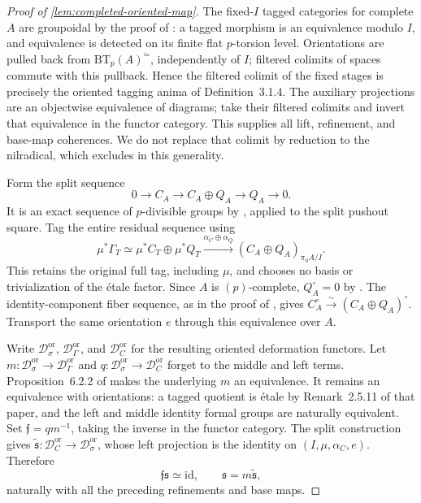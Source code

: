 \documentclass[11pt]{article}
\numberwithin{equation}{section}
\theoremstyle{definition}
\theoremstyle{remark}
\begin{document}
\begin{proof}[Proof of \cref{lem:completed-oriented-map}]
The fixed-\(I\) tagged categories for complete \(A\) are groupoidal by
the proof of \cite[Lemma~3.1.10]{LurieEllipticII2018}: a tagged morphism
is an equivalence modulo \(I\), and equivalence is detected on its finite
flat \(p\)-torsion level. Orientations are pulled back from
\(\mathrm{BT}_p(A)^\simeq\), independently of \(I\); filtered colimits
of spaces commute with this pullback. Hence the filtered colimit of the
fixed stages is precisely the oriented tagging anima of
Definition~3.1.4. The auxiliary projections are an objectwise
equivalence of diagrams; take their filtered colimits and invert that
equivalence in the functor category. This supplies all lift, refinement,
and base-map coherences. We do not replace that colimit by reduction
to the nilradical, which \cite[Warning~3.1.9]{LurieEllipticII2018} excludes
in this generality.

Form the split sequence
\[
 0\longrightarrow C_A\longrightarrow C_A\oplus Q_A
 \longrightarrow Q_A\longrightarrow0.
\]
It is an exact sequence of \(p\)-divisible groups by
\cite[Proposition~2.4.8]{LurieEllipticII2018}, applied to the split pushout
square. Tag the entire residual sequence using
\[
 \mu^*\Gamma_T\simeq\mu^*C_T\oplus\mu^*Q_T
 \xrightarrow{\alpha_C\oplus\alpha_Q}
 (C_A\oplus Q_A)_{\pi_0A/I}.
\]
This retains the original full tag, including \(\mu\), and chooses no
basis or trivialization of the étale factor. Since \(A\) is
\((p)\)-complete, \(Q_A^\circ=0\) by
\cite[Proposition~2.5.8]{LurieEllipticII2018}. The identity-component fiber
sequence, as in the proof of
\cite[Proposition~2.5.17]{LurieEllipticII2018}, gives
\(C_A^\circ\xrightarrow{\sim}(C_A\oplus Q_A)^\circ\).
Transport the same orientation \(e\) through this equivalence over \(A\).

Write \(\mathscr D_\sigma^{\mathrm{or}}\),
\(\mathscr D_\Gamma^{\mathrm{or}}\), and
\(\mathscr D_C^{\mathrm{or}}\) for the resulting oriented deformation
functors. Let \(m:\mathscr D_\sigma^{\mathrm{or}}\to
\mathscr D_\Gamma^{\mathrm{or}}\) and
\(q:\mathscr D_\sigma^{\mathrm{or}}\to\mathscr D_C^{\mathrm{or}}\)
forget to the middle and left terms. Proposition~6.2.2 of
\cite{LurieEllipticII2018} makes the underlying \(m\) an equivalence.
It remains an equivalence with orientations: a tagged quotient is étale
by Remark~2.5.11 of that paper, and the left and middle identity formal
groups are naturally equivalent. Set \(\mathfrak f=qm^{-1}\), taking the
inverse in the functor category. The split construction gives
\(\widetilde{\mathfrak s}:\mathscr D_C^{\mathrm{or}}\to
\mathscr D_\sigma^{\mathrm{or}}\), whose left projection is the identity
on \((I,\mu,\alpha_C,e)\). Therefore
\[
 \mathfrak f\mathfrak s\simeq\mathrm{id},
 \qquad \mathfrak s=m\widetilde{\mathfrak s},
\]
naturally with all the preceding refinements and base maps.


\end{proof}
\end{document}
